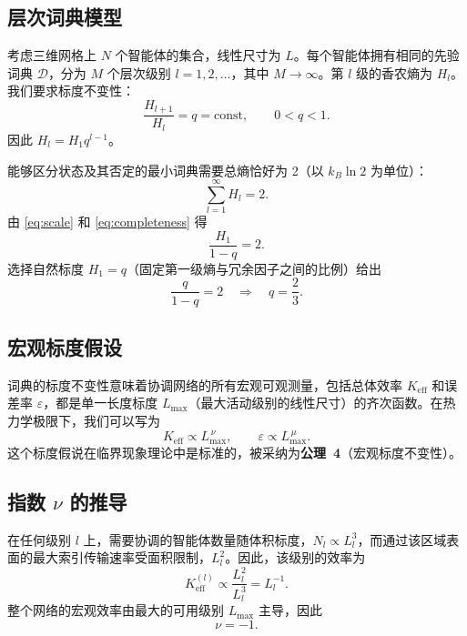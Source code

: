 \documentclass[11pt,a4paper]{article}
\newcommand{\Dir}{\mathcal{D}}
\begin{document}
	\subsection{层次词典模型}
	考虑三维网格上 \(N\) 个智能体的集合，线性尺寸为 \(L\)。每个智能体拥有相同的先验词典 \(\Dir\)，分为 \(M\) 个层次级别 \(l = 1,2,\dots\)，其中 \(M \to \infty\)。第 \(l\) 级的香农熵为 \(H_l\)。我们要求标度不变性：
	\begin{equation}
		\frac{H_{l+1}}{H_l} = q = \text{const}, \qquad 0 < q < 1. \label{eq:scale}
	\end{equation}
	因此 \(H_l = H_1 q^{l-1}\)。
	
	能够区分状态及其否定的最小词典需要总熵恰好为 2（以 \(k_B \ln 2\) 为单位）：
	\begin{equation}
		\sum_{l=1}^{\infty} H_l = 2. \label{eq:completeness}
	\end{equation}
	由 \eqref{eq:scale} 和 \eqref{eq:completeness} 得
	\[
	\frac{H_1}{1-q} = 2.
	\]
	选择自然标度 \(H_1 = q\)（固定第一级熵与冗余因子之间的比例）给出
	\[
	\frac{q}{1-q} = 2 \quad\Longrightarrow\quad q = \frac{2}{3}. \label{eq:qval}
	\]
	
	\subsection{宏观标度假设}
	词典的标度不变性意味着协调网络的所有宏观可观测量，包括总体效率 \(K_{\mathrm{eff}}\) 和误差率 \(\varepsilon\)，都是单一长度标度 \(L_{\max}\)（最大活动级别的线性尺寸）的齐次函数。在热力学极限下，我们可以写为
	\begin{equation}
		K_{\mathrm{eff}} \propto L_{\max}^{\,\nu}, \qquad \varepsilon \propto L_{\max}^{\,\mu}. \label{eq:scaling-assume}
	\end{equation}
	这个标度假说在临界现象理论中是标准的，被采纳为\textbf{公理~4}（宏观标度不变性）。
	
	\subsection{指数 \(\nu\) 的推导}
	在任何级别 \(l\) 上，需要协调的智能体数量随体积标度，\(N_l \propto L_l^3\)，而通过该区域表面的最大索引传输速率受面积限制，\(L_l^2\)。因此，该级别的效率为
	\[
	K_{\mathrm{eff}}^{(l)} \propto \frac{L_l^2}{L_l^3} = L_l^{-1}.
	\]
	整个网络的宏观效率由最大的可用级别 \(L_{\max}\) 主导，因此
	\[
	\nu = -1. \label{eq:nu}
	\]
	
\end{document}
